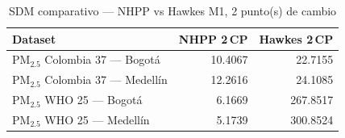 \begin{table}[htbp]
\centering
\caption{SDM comparativo --- NHPP vs Hawkes M1, 2 punto(s) de cambio}
\label{tab:comp_sdm_2cp}
\begin{tabular}{lrr}
\toprule
Dataset & NHPP 2\,CP & Hawkes 2\,CP \\
\midrule
PM$_{2.5}$ Colombia 37 --- Bogot\'{a} & 10.4067 & 22.7155 \\
PM$_{2.5}$ Colombia 37 --- Medell\'{i}n & 12.2616 & 24.1085 \\
PM$_{2.5}$ WHO 25 --- Bogot\'{a} & 6.1669 & 267.8517 \\
PM$_{2.5}$ WHO 25 --- Medell\'{i}n & 5.1739 & 300.8524 \\
\bottomrule
\end{tabular}
\end{table}
